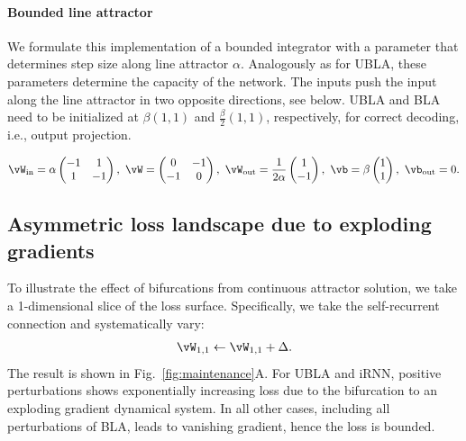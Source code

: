 \documentclass{article}
\newcounter{ct}
\newcommand{\win}{\vW_{\text{in}}}
\newcommand{\wout}{\vW_{\text{out}}}
\newcommand{\bout}{\vb_{\text{out}}}
\theoremstyle{definition}
\theoremstyle{remark}
\begin{document}
\paragraph{Bounded line attractor}\label{sec:bla}
We formulate this implementation of a bounded integrator with a parameter that determines step size along line attractor $\alpha$. Analogously as for UBLA, these parameters determine the capacity of the network.
The inputs push the input along the line attractor in two opposite directions, see below. UBLA and BLA need to be initialized at $\beta(1,1)$ and $\tfrac{\beta}{2}(1,1)$, respectively, for correct decoding, i.e., output projection.

\begin{equation}\label{eq:bla}
\win = \alpha
\begin{pmatrix}
-1  &  1 \\
1  &  -1
\end{pmatrix}, \
\vW = 
\begin{pmatrix}
0  &  -1 \\
-1  &  0
\end{pmatrix}, \
\wout = \frac{1}{2\alpha}
\begin{pmatrix}
1  \\  -1 
\end{pmatrix}, \
\vb = \beta
\begin{pmatrix}
1 \\  1 
\end{pmatrix}, \
\bout = 0.
\end{equation}

\subsection{Asymmetric loss landscape due to exploding gradients}
To illustrate the effect of bifurcations from continuous attractor solution, we take a 1-dimensional slice of the loss surface.
Specifically, we take the self-recurrent connection and systematically vary:
\begin{align}
    \vW_{1,1} \leftarrow \vW_{1,1} + \Delta.
\end{align}
The result is shown in Fig.~\ref{fig:maintenance}A.
For UBLA and iRNN, positive perturbations shows exponentially increasing loss due to the bifurcation to an exploding gradient dynamical system.
In all other cases, including all perturbations of BLA, leads to vanishing gradient, hence the loss is bounded.
\end{document}
